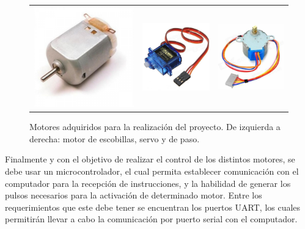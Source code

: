 \begin{itemize}
	\begin{figure}[h]
		\centering
		\begin{tabular}{ccc}
			\includegraphics[width = 0.3\linewidth]{figures/brushed.jpg} &
			\includegraphics[width = 0.3\linewidth]{figures/stepper.JPG} & 
			\includegraphics[width = 0.3\linewidth]{figures/paso.jpg}
		\end{tabular}
		\caption{Motores adquiridos para la realización del proyecto. De izquierda a derecha: motor de escobillas, servo y de paso.}
	\end{figure}
\end{itemize}

Finalmente y con el objetivo de realizar el control de los distintos motores, se debe usar un microcontrolador, el cual permita establecer comunicación con el computador para la recepción de instrucciones, y la habilidad de generar los pulsos necesarios para la activación de determinado motor. Entre los requerimientos que este debe tener se encuentran los puertos UART, los cuales permitirán llevar a cabo la comunicación por puerto serial con el computador.